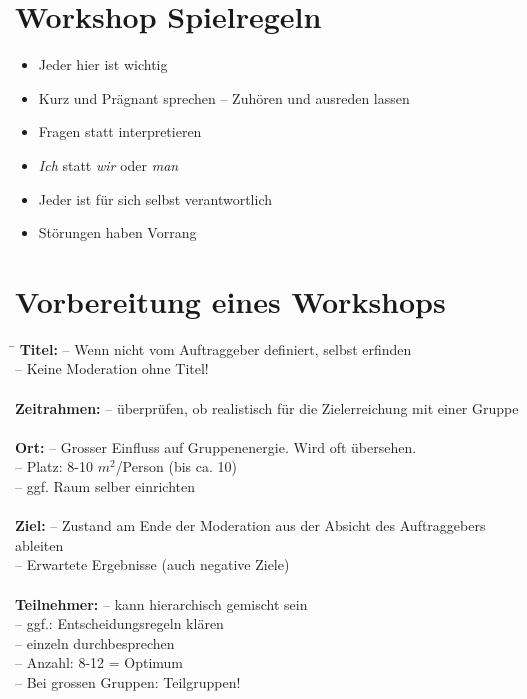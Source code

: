 \section{Workshop Spielregeln}

\begin{itemize}
	\item Jeder hier ist wichtig
	\item Kurz und Prägnant sprechen -- Zuhören und ausreden lassen
	\item Fragen statt interpretieren
	\item \emph{Ich} statt \emph{wir} oder \emph{man}
	\item Jeder ist für sich selbst verantwortlich
	\item Störungen haben Vorrang
\end{itemize}

\section{Vorbereitung eines Workshops}

\begin{tabbing}
	\hspace{3cm}\=\kill
	\textbf{Titel:}	\> -- Wenn nicht vom Auftraggeber definiert, selbst erfinden\\ 
					\> -- Keine Moderation ohne Titel!\\ \\
	\textbf{Zeitrahmen:} \> -- überprüfen, ob realistisch für die Zielerreichung mit einer Gruppe \\ \\
	\textbf{Ort:} 	\> -- Grosser Einfluss auf Gruppenenergie. Wird oft übersehen.\\ 
					\> -- Platz: 8-10 $m^2$/Person (bis ca. 10) \\ 
					\> -- ggf. Raum selber einrichten \\ \\ 
	\textbf{Ziel:} 	\> -- Zustand am Ende der Moderation aus der Absicht des Auftraggebers ableiten \\ 
					\> -- Erwartete Ergebnisse (auch negative Ziele) \\ \\
	\textbf{Teilnehmer:}	\> -- kann hierarchisch gemischt sein \\ 
							\> -- ggf.: Entscheidungsregeln klären \\ 
							\> -- einzeln durchbesprechen \\ 
							\> -- Anzahl: 8-12 = Optimum \\ 
							\> -- Bei grossen Gruppen: Teilgruppen! 
\end{tabbing}

